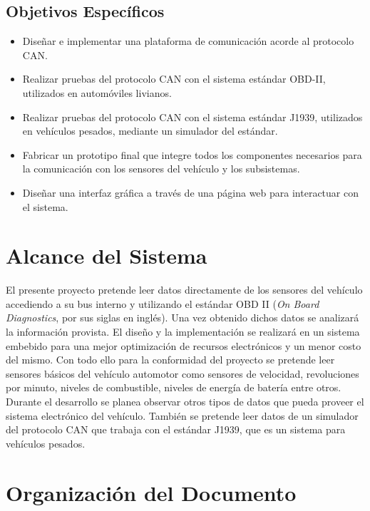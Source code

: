 \subsection{Objetivos Específicos}

\begin{itemize}
	\item Diseñar e implementar una plataforma de comunicación acorde al protocolo CAN. 

	\item Realizar pruebas  del protocolo CAN con el sistema estándar OBD-II, utilizados en automóviles livianos.
	
	\item Realizar pruebas  del protocolo CAN con el sistema estándar J1939, utilizados en vehículos pesados, mediante un  simulador del estándar.
	
	\item Fabricar un prototipo final que integre todos los componentes necesarios para la comunicación con los sensores del vehículo y los subsistemas.
	
	\item Diseñar una interfaz gráfica a través de una página web para interactuar con el sistema.
		
\end{itemize}

\section{Alcance del Sistema}
 El presente proyecto pretende leer datos directamente de los sensores del vehículo accediendo a su bus interno y utilizando el estándar OBD II (\textit{On Board Diagnostics}, por sus siglas en inglés). 
 Una vez obtenido dichos datos se analizará la información provista.  
 El diseño y la implementación se realizará en un sistema embebido para una mejor optimización de recursos electrónicos y un menor costo del mismo. 
 Con todo ello para la conformidad del proyecto se pretende leer sensores básicos del vehículo automotor como sensores de velocidad, revoluciones por minuto, niveles de combustible, niveles de energía de batería entre otros. 
 Durante el desarrollo se planea observar otros tipos de datos que pueda proveer el sistema electrónico del vehículo. 
 También se pretende leer datos de un simulador del protocolo CAN que trabaja con el estándar J1939, que es un sistema para vehículos pesados. 
 
 
\section{Organización del Documento}


